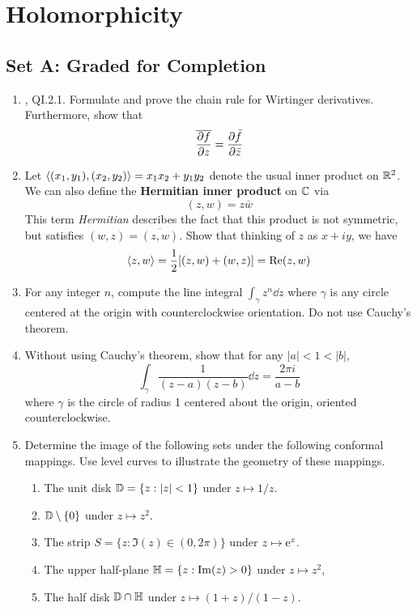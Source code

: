 \documentclass[../psets.tex]{subfiles}
\begin{document}
\section{Holomorphicity}
\subsection*{Set A: Graded for Completion}
\begin{enumerate}
    \item {}\textcite{bib:FischerLieb}, QI.2.1. Formulate and prove the chain rule for Wirtinger derivatives. Furthermore, show that
    \begin{equation*}
        \overline{\pdv{f}{z}} = \pdv{\bar{f}}{\bar{z}}
    \end{equation*}
    \item Let $\inp{(x_1,y_1),(x_2,y_2)}=x_1x_2+y_1y_2$ denote the usual inner product on $\R^2$. We can also define the \textbf{Hermitian inner product} on $\C$ via
    \begin{equation*}
        (z,w) = z\bar{w}
    \end{equation*}
    This term \emph{Hermitian} describes the fact that this product is not symmetric, but satisfies $(w,z)=\overline{(z,w)}$. Show that thinking of $z$ as $x+iy$, we have
    \begin{equation*}
        \inp{z,w} = \frac{1}{2}[(z,w)+(w,z)] = \re(z,w)
    \end{equation*}
    \item For any integer $n$, compute the line integral $\int_\gamma z^n\dd{z}$ where $\gamma$ is any circle centered at the origin with counterclockwise orientation. Do not use Cauchy's theorem.
    \item Without using Cauchy's theorem, show that for any $|a|<1<|b|$,
    \begin{equation*}
        \int_\gamma\frac{1}{(z-a)(z-b)}\dd{z} = \frac{2\pi i}{a-b}
    \end{equation*}
    where $\gamma$ is the circle of radius 1 centered about the origin, oriented counterclockwise.
    \item Determine the image of the following sets under the following conformal mappings. Use level curves to illustrate the geometry of these mappings.
    \begin{enumerate}
        \item The unit disk $\D=\{z:|z|<1\}$ under $z\mapsto 1/z$.
        \item $\D\setminus\{0\}$ under $z\mapsto z^2$.
        \item The strip $S=\{z:\Im(z)\in(0,2\pi)\}$ under $z\mapsto\e[z]$.
        \item The upper half-plane $\Hh=\{z:\Im(z)>0\}$ under $z\mapsto z^2$,
        \item The half disk $\D\cap\Hh$ under $z\mapsto(1+z)/(1-z)$.
    \end{enumerate}
\end{enumerate}
\end{document}
